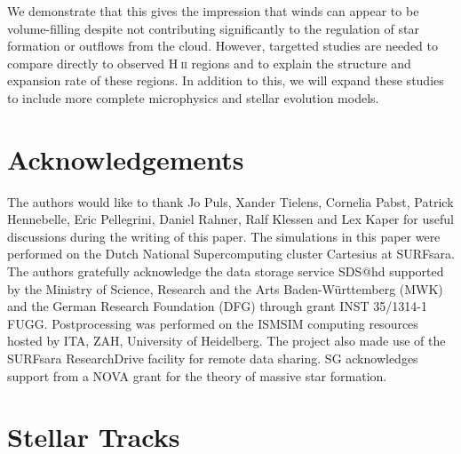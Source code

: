 \documentclass[a4paper,fleqn,usenatbib]{mnras}
\newcommand{\HII}{H$~$\textsc{ii}\xspace}
\begin{document}
We demonstrate that this gives the impression that winds can appear to be volume-filling despite not contributing significantly to the regulation of star formation or outflows from the cloud. However, targetted studies are needed to compare directly to observed \HII regions and to explain the structure and expansion rate of these regions. In addition to this, we will expand these studies to include more complete microphysics and stellar evolution models.

\section*{Acknowledgements}

The authors would like to thank Jo Puls, Xander Tielens, Cornelia Pabst, Patrick Hennebelle, Eric Pellegrini, Daniel Rahner, Ralf Klessen and Lex Kaper for useful discussions during the writing of this paper. The simulations in this paper were performed on the Dutch National Supercomputing cluster Cartesius at SURFsara. The authors gratefully acknowledge the data storage service SDS@hd supported by the Ministry of Science, Research and the Arts Baden-W\"urttemberg (MWK) and the German Research Foundation (DFG) through grant INST 35/1314-1 FUGG. Postprocessing was performed on the ISMSIM computing resources hosted by ITA, ZAH, University of Heidelberg. The project also made use of the SURFsara ResearchDrive facility for remote data sharing. SG acknowledges support from a NOVA grant for the theory of massive star formation.








\appendix
%
%
\section{Stellar Tracks}
\label{appendix:stellartracks}
\end{document}
